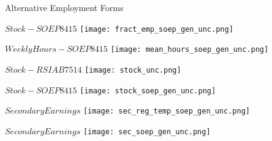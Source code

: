\documentclass{beamer}
\begin{document}
\begin{frame}{Alternative Employment Forms}
\begin{minipage}[b]{0.3\textwidth}{$Stock - SOEP8415$}
\centering
\texttt{[image: fract\_emp\_soep\_gen\_unc.png]}
\end{minipage}
\begin{minipage}[b]{0.3\textwidth}{$Weekly Hours - SOEP8415$}
\centering
\texttt{[image: mean\_hours\_soep\_gen\_unc.png]}
\end{minipage}
\begin{minipage}[b]{0.3\textwidth}{$Stock - RSIAB7514$}
\centering
\texttt{[image: stock\_unc.png]}
\end{minipage}
\begin{minipage}[b]{0.3\textwidth}{$Stock - SOEP8415$}
\centering
\texttt{[image: stock\_soep\_gen\_unc.png]}
\end{minipage}
\begin{minipage}[b]{0.3\textwidth}{$Secondary Earnings$}
\centering
\texttt{[image: sec\_reg\_temp\_soep\_gen\_unc.png]}
\end{minipage}
\begin{minipage}[b]{0.3\textwidth}{$Secondary Earnings$}
\centering
\texttt{[image: sec\_soep\_gen\_unc.png]}
\end{minipage}
\end{frame}
\end{document}
